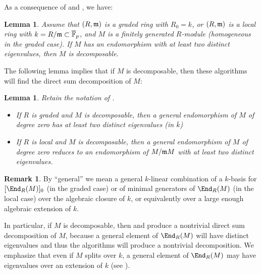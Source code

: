 \documentclass[12pt]{article}
\let\bar\overline
\theoremstyle{theorem}
\numberwithin{thm}{section}
\newtheorem{lem}[thm]{Lemma}
\theoremstyle{definition}
\newtheorem{rem}[thm]{Remark}
\begin{document}
As a consequence of  and , we have:

\begin{lem}\label{lem:terminates}
  Assume that $(R,\mathfrak m)$ is a graded ring with $R_0=k$, or $(R,\mathfrak m)$ is a local ring with $k=R/\m\subset \bar \F_p$, and $M$ is a finitely generated $R$-module (homogeneous in the graded case).
  If $M$ has an endomorphism with at least two distinct eigenvalues, then $M$ is decomposable.
\end{lem}

The following lemma implies that if $M$ is decomposable, then these algorithms will find the direct sum decomposition of $M$:

\begin{lem}\label{lem:distinct}
  Retain the notation of .
  \begin{itemize}
  \item If $R$ is graded and $M$ is decomposable, then a general endomorphism of $M$ of degree zero has at least two distinct eigenvalues (in $\bar k$)
  \item If $R$ is local and $M$ is decomposable, then a general endomorphism of $M$ of degree zero reduces to an endomorphism of $M/\mathfrak m M$ with at least two distinct eigenvalues.
  \end{itemize}
\end{lem}

\begin{rem}\label{rem:general}
  By ``general'' we mean a general $k$-linear combination of a $k$-basis for $[\End_R(M)]_0$ (in the graded case) or of minimal generators of $\End_R(M)$ (in the local case) over the algebraic closure of $k$, or equivalently over a large enough algebraic extension of $k$.
\end{rem}

In particular, if $M$ is decomposable, then  and  produce a nontrivial direct sum decomposition of $M$, because a general element of $\End_R(M)$ will have distinct eigenvalues and thus the algorithms will produce a nontrivial decomposition. We emphasize that even if $M$ splits over $k$, a general element of $\End_R(M)$ may have eigenvalues over an extension of $k$ (see ).
\end{document}
